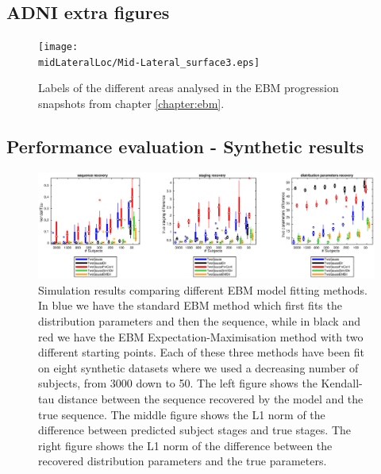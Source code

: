 \chapter{}

\section{ADNI extra figures}
\label{sec:adni_extra_appendix}


\newcommand*{\midLateralLoc}{../drawImages/input/images}
\newcommand*{\scaleLabelImg}{0.7}
\begin{figure}[h]
  \centering
  \texttt{[image: \\midLateralLoc/Mid-Lateral\_surface3.eps]}
  \caption{Labels of the different areas analysed in the EBM progression snapshots from chapter \ref{chapter:ebm}. }
  \label{fig:ebmSnapLabels}
\end{figure}

\vspace{10cm}

\section{Performance evaluation - Synthetic results}

\newcommand{\ctlPrecCaption}{ \caption{increasing precision of the control group diagnosis, i.e. the controls start from being spread along the disease course to being only at the very early stages. }}

\newcommand{\simFigScale}{0.45}


\begin{figure}[H]
 \hspace{-2cm}
 \includegraphics[scale=\simFigScale]{images/ebm/synthetic/metricsTwoGauss_incrSubj.eps}
\caption{Simulation results comparing different EBM model fitting methods. In blue we have the standard EBM method which first fits the distribution parameters and then the sequence, while in black and red we have the EBM Expectation-Maximisation method with two different starting points. Each of these three methods have been fit on eight synthetic datasets where we used a decreasing number of subjects, from 3000 down to 50. The left figure shows the Kendall-tau distance between the sequence recovered by the model and the true sequence. The middle figure shows the L1 norm of the difference between predicted subject stages and true stages. The right figure shows the L1 norm of the difference between the recovered distribution parameters and the true parameters.}
 \label{fig:incrSubjTG}
\end{figure}

